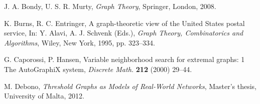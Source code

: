 \documentclass[10pt,a4paper]{article}
\begin{document}
 \begin{thebibliography}{00}



 J. A. Bondy, U. S. R. Murty, {\it Graph Theory}, Springer, London, 2008.

 K. Burns, R. C. Entringer, A graph-theoretic view of the United States postal service, In: Y. Alavi, A. J. Schvenk (Eds.), {\it Graph Theory, Combinatorics and Algorithms}, Wiley, New York, 1995, pp. 323--334.

  G. Caporossi, P. Hansen, Variable neighborhood search for extremal graphs: 1 The AutoGraphiX system, {\it Discrete Math.} {\bf 212} (2000) 29--44.

 M. Debono, {\it Threshold Graphs as Models of Real-World Networks}, Master's thesis, University of Malta, 2012.



\end{thebibliography}
\end{document}
